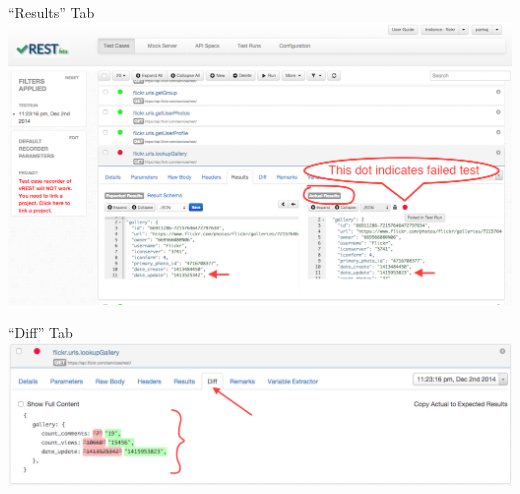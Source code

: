 \documentclass{beamer}
\begin{document}
\begin{frame}{``Results'' Tab}
    \includegraphics[scale=0.30]{images/actual_result.PNG}
\end{frame}
\begin{frame}{``Diff'' Tab}
    \includegraphics[scale=0.30]{images/view_diff_after_filter.PNG}
\end{frame}
\end{document}
